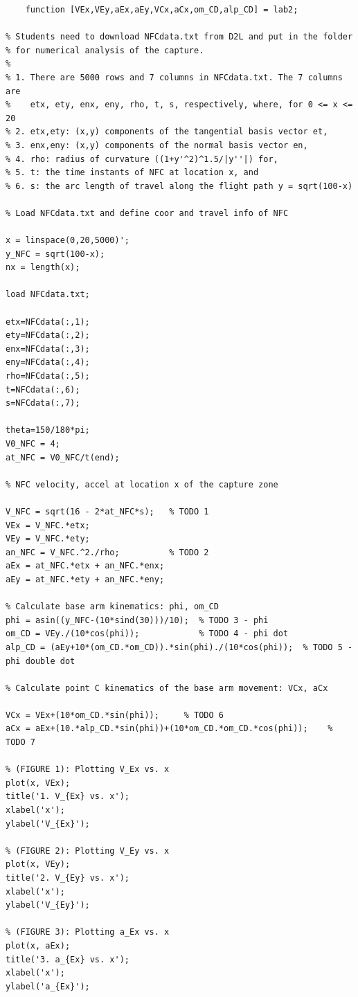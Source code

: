 \documentclass[12pt, a4paper]{article}
\begin{document}
\begin{lstlisting}
    function [VEx,VEy,aEx,aEy,VCx,aCx,om_CD,alp_CD] = lab2;

% Students need to download NFCdata.txt from D2L and put in the folder 
% for numerical analysis of the capture.
%
% 1. There are 5000 rows and 7 columns in NFCdata.txt. The 7 columns are 
%    etx, ety, enx, eny, rho, t, s, respectively, where, for 0 <= x <= 20
% 2. etx,ety: (x,y) components of the tangential basis vector et, 
% 3. enx,eny: (x,y) components of the normal basis vector en, 
% 4. rho: radius of curvature ((1+y'^2)^1.5/|y''|) for, 
% 5. t: the time instants of NFC at location x, and
% 6. s: the arc length of travel along the flight path y = sqrt(100-x)

% Load NFCdata.txt and define coor and travel info of NFC

x = linspace(0,20,5000)';
y_NFC = sqrt(100-x);
nx = length(x);

load NFCdata.txt;

etx=NFCdata(:,1);
ety=NFCdata(:,2);
enx=NFCdata(:,3);
eny=NFCdata(:,4);
rho=NFCdata(:,5);
t=NFCdata(:,6);
s=NFCdata(:,7);

theta=150/180*pi;
V0_NFC = 4;
at_NFC = V0_NFC/t(end);

% NFC velocity, accel at location x of the capture zone

V_NFC = sqrt(16 - 2*at_NFC*s);   % TODO 1
VEx = V_NFC.*etx;
VEy = V_NFC.*ety;
an_NFC = V_NFC.^2./rho;          % TODO 2
aEx = at_NFC.*etx + an_NFC.*enx;
aEy = at_NFC.*ety + an_NFC.*eny;

% Calculate base arm kinematics: phi, om_CD
phi = asin((y_NFC-(10*sind(30)))/10);  % TODO 3 - phi
om_CD = VEy./(10*cos(phi));            % TODO 4 - phi dot 
alp_CD = (aEy+10*(om_CD.*om_CD)).*sin(phi)./(10*cos(phi));  % TODO 5 - phi double dot

% Calculate point C kinematics of the base arm movement: VCx, aCx

VCx = VEx+(10*om_CD.*sin(phi));     % TODO 6
aCx = aEx+(10.*alp_CD.*sin(phi))+(10*om_CD.*om_CD.*cos(phi));    % TODO 7

% (FIGURE 1): Plotting V_Ex vs. x
plot(x, VEx);
title('1. V_{Ex} vs. x');
xlabel('x');
ylabel('V_{Ex}');

% (FIGURE 2): Plotting V_Ey vs. x
plot(x, VEy);
title('2. V_{Ey} vs. x');
xlabel('x');
ylabel('V_{Ey}');

% (FIGURE 3): Plotting a_Ex vs. x
plot(x, aEx);
title('3. a_{Ex} vs. x');
xlabel('x');
ylabel('a_{Ex}');


\end{lstlisting}
\end{document}
